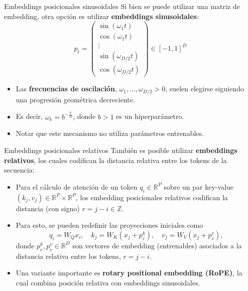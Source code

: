 \documentclass{beamer}
\newcommand{\R}{\mathbb{R}}
\newcommand{\Z}{\mathbb{Z}}
\begin{document}
\begin{frame}{Embeddings posicionales sinusoidales}
    Si bien se puede utilizar una matriz de embedding, otra opción es utilizar \textbf{embeddings sinusoidales}:
    \begin{equation*}
        p_t=
        \left(
        \begin{matrix}
                \sin(\omega_1 t) \\ \cos(\omega_1 t)\\ \vdots \\ \sin(\omega_{D/2} t)\\ \cos(\omega_{D/2} t)
            \end{matrix}
        \right)\in[-1,1]^D
    \end{equation*}
    \vspace{-0.5cm}
    \begin{itemize}
        \item Las \textbf{frecuencias de oscilación}, $\omega_1,\ldots,\omega_{D/2}>0$, suelen elegirse siguiendo una progresión geométrica decreciente.
        \item Es decir, $\omega_k = b^{-\frac{k}{D}}$, donde $b>1$ es un hiperparámetro.
        \item Notar que este mecanismo no utiliza parámetros entrenables.
    \end{itemize}
\end{frame}

\begin{frame}{Embeddings posicionales relativos}
    También es posible utilizar \textbf{embeddings relativos}, los cuales codifican la distancia relativa entre los tokens de la secuencia:
    \begin{itemize}
        \item Para el cálculo de atención de un token $q_i\in\R^P$ sobre un par key-value $(k_j,v_j)\in\R^P\times\R^P$, los embedding posicionales relativos codifican la distancia (con signo) $r=j-i\in\Z$.
        \item Para esto, se pueden redefinir las proyecciones iniciales como
              \begin{equation*}
                  q_i=W_Q x_i,
                  \quad
                  k_j=W_K(x_j+p^k_r),
                  \quad
                  v_j=W_V(x_j+p^v_r),
              \end{equation*}
              donde $p^k_r, p^v_r\in\R^D$ son vectores de embedding (entrenables) asociados a la distancia relativa entre los tokens, $r=j-i$.
        \item Una variante importante es \textbf{rotary positional embedding (RoPE)}, la cual combina posición relativa con embeddings sinusoidales.
    \end{itemize}
\end{frame}
\end{document}
